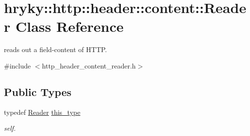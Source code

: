 \hypertarget{classhryky_1_1http_1_1header_1_1content_1_1_reader}{\section{hryky\-:\-:http\-:\-:header\-:\-:content\-:\-:Reader Class Reference}
\label{classhryky_1_1http_1_1header_1_1content_1_1_reader}
}


reads out a field-\/content of H\-T\-T\-P.  




{\ttfamily \#include $<$http\-\_\-header\-\_\-content\-\_\-reader.\-h$>$}

\subsection*{Public Types}
\begin{DoxyCompactItemize}
\item 
\hypertarget{classhryky_1_1http_1_1header_1_1content_1_1_reader_a1041bb4633368aa6791460aa794e6ea9}{typedef \hyperlink{classhryky_1_1http_1_1header_1_1content_1_1_reader}{Reader} \hyperlink{classhryky_1_1http_1_1header_1_1content_1_1_reader_a1041bb4633368aa6791460aa794e6ea9}{this\-\_\-type}}\label{classhryky_1_1http_1_1header_1_1content_1_1_reader_a1041bb4633368aa6791460aa794e6ea9}

\begin{DoxyCompactList}\small\item\em self. \end{DoxyCompactList}\end{DoxyCompactItemize}

